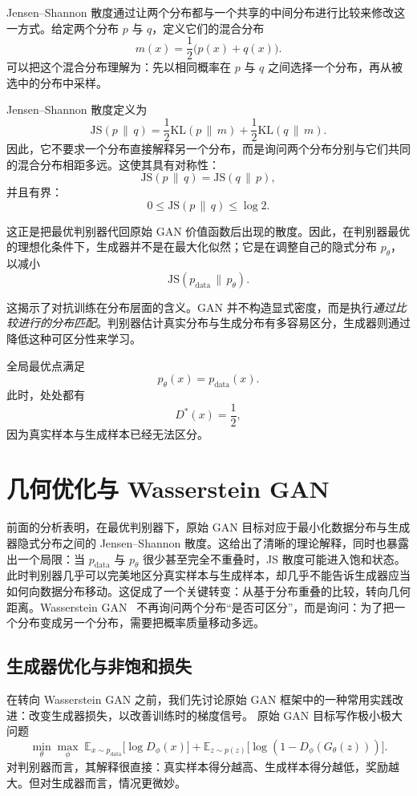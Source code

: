 Jensen--Shannon 散度通过让两个分布都与一个共享的中间分布进行比较来修改这一方式。给定两个分布 $p$ 与 $q$，定义它们的混合分布
\[
m(x)
=
\frac{1}{2}\big(p(x)+q(x)\big).
\]
可以把这个混合分布理解为：先以相同概率在 $p$ 与 $q$ 之间选择一个分布，再从被选中的分布中采样。

Jensen--Shannon 散度定义为
\[
\boxed{
\mathrm{JS}(p\,\|\,q)
=
\frac{1}{2}\mathrm{KL}(p\,\|\,m)
+
\frac{1}{2}\mathrm{KL}(q\,\|\,m).
}
\]
因此，它不要求一个分布直接解释另一个分布，而是询问两个分布分别与它们共同的混合分布相距多远。这使其具有对称性：
\[
\mathrm{JS}(p\,\|\,q)
=
\mathrm{JS}(q\,\|\,p),
\]
并且有界：
\[
0
\leq
\mathrm{JS}(p\,\|\,q)
\leq
\log 2.
\]

这正是把最优判别器代回原始 GAN 价值函数后出现的散度。因此，在判别器最优的理想化条件下，生成器并不是在最大化似然；它是在调整自己的隐式分布 $p_\theta$，以减小
\[
\mathrm{JS}\!\left(p_{\text{data}}\,\|\,p_\theta\right).
\]

这揭示了对抗训练在分布层面的含义。GAN 并不构造显式密度，而是执行\emph{通过比较进行的分布匹配}。判别器估计真实分布与生成分布有多容易区分，生成器则通过降低这种可区分性来学习。

全局最优点满足
\[
p_\theta(x)=p_{\text{data}}(x).
\]
此时，处处都有
\[
D^*(x)=\frac{1}{2},
\]
因为真实样本与生成样本已经无法区分。

\section{几何优化与 Wasserstein GAN}

前面的分析表明，在最优判别器下，原始 GAN 目标对应于最小化数据分布与生成器隐式分布之间的 Jensen--Shannon 散度。这给出了清晰的理论解释，同时也暴露出一个局限：当 $p_{\text{data}}$ 与 $p_\theta$ 很少甚至完全不重叠时，JS 散度可能进入饱和状态。此时判别器几乎可以完美地区分真实样本与生成样本，却几乎不能告诉生成器应当如何向数据分布移动。这促成了一个关键转变：从基于分布重叠的比较，转向几何距离。Wasserstein GAN~\cite{arjovsky2017wasserstein} 不再询问两个分布“是否可区分”，而是询问：为了把一个分布变成另一个分布，需要把概率质量移动多远。

\subsection{生成器优化与非饱和损失}

在转向 Wasserstein GAN 之前，我们先讨论原始 GAN 框架中的一种常用实践改进：改变生成器损失，以改善训练时的梯度信号。
原始 GAN 目标写作极小极大问题
\[
\min_\theta \max_\phi
\;
\mathbb{E}_{x \sim p_{\text{data}}}\big[\log D_\phi(x)\big]
+
\mathbb{E}_{z \sim p(z)}\big[\log (1 - D_\phi(G_\theta(z)))\big].
\]
对判别器而言，其解释很直接：真实样本得分越高、生成样本得分越低，奖励越大。但对生成器而言，情况更微妙。

